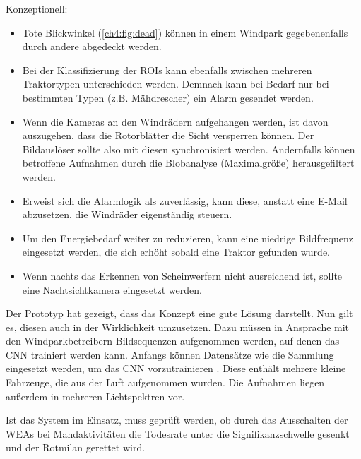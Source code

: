 \bigskip
Konzeptionell: 
\begin{itemize}
    \item 
    Tote Blickwinkel (\autoref{ch4:fig:dead}) können in einem Windpark gegebenenfalls durch andere  abgedeckt werden. 

    \item
    Bei der Klassifizierung der \acp{ROI} kann ebenfalls zwischen mehreren Traktortypen unterschieden werden.
    Demnach kann bei Bedarf nur bei bestimmten Typen (z.B. Mähdrescher) ein Alarm gesendet werden.

    \item
    Wenn die Kameras an den Windrädern aufgehangen werden, ist davon auszugehen, dass die Rotorblätter die Sicht versperren können.
    Der Bildauslöser sollte also mit diesen synchronisiert werden.
    Andernfalls können betroffene Aufnahmen durch die Blobanalyse (Maximalgröße) herausgefiltert werden.

    \item
    Erweist sich die Alarmlogik als zuverlässig, kann diese, anstatt eine E-Mail abzusetzen, die Windräder eigenständig steuern.

    \item
    Um den Energiebedarf weiter zu reduzieren, kann eine niedrige Bildfrequenz eingesetzt werden, die sich erhöht sobald eine Traktor gefunden wurde.
    
    \item
    Wenn nachts das Erkennen von Scheinwerfern nicht ausreichend ist, sollte eine Nachtsichtkamera eingesetzt werden.
\end{itemize}

\bigskip
Der Prototyp hat gezeigt, dass das Konzept eine gute Lösung darstellt.
Nun gilt es, diesen auch in der Wirklichkeit umzusetzen.
Dazu müssen in Ansprache mit den Windparkbetreibern Bildsequenzen aufgenommen werden, auf denen das \ac{CNN} trainiert werden kann.
Anfangs können Datensätze wie die  Sammlung eingesetzt werden, um das \ac{CNN} vorzutrainieren \cite{razakarivony_vehicle_2016}.
Diese enthält mehrere kleine Fahrzeuge, die aus der Luft aufgenommen wurden.
Die Aufnahmen liegen außerdem in mehreren Lichtspektren vor.

\bigskip
Ist das System im Einsatz, muss geprüft werden, ob durch das Ausschalten der \acp{WEA} bei Mahdaktivitäten die Todesrate unter die Signifikanzschwelle gesenkt und der Rotmilan gerettet wird.
